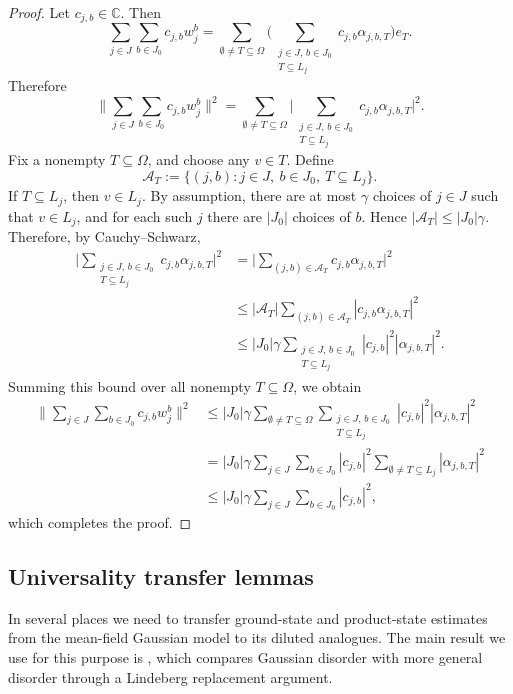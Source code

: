 \documentclass[12pt]{article}
\newcommand{\C}{\mathbb{C}}
\newcommand{\mcA}{\mathcal{A}}
\begin{document}
\begin{appendix}
\begin{proof}
Let \(c_{j,b}\in\C\).
Then
\[
\sum_{j\in J}\sum_{b\in J_0} c_{j,b}w_j^b
=
\sum_{\emptyset\neq T\subseteq\Omega}
\bigg(
\sum_{\substack{j\in J,\,b\in J_0\\ T\subseteq L_j}}
c_{j,b}\alpha_{j,b,T}
\bigg)e_T.
\]
Therefore
\[
\bigg \|
\sum_{j\in J}\sum_{b\in J_0} c_{j,b}w_j^b
\bigg \|^2
=
\sum_{\emptyset\neq T\subseteq\Omega}
\bigg |
\sum_{\substack{j\in J,\,b\in J_0\\ T\subseteq L_j}}
c_{j,b}\alpha_{j,b,T}
\bigg |^2.
\]
Fix a nonempty \(T\subseteq\Omega\), and choose any \(v\in T\). Define
\[
\mcA_T
:=
\{(j,b):j\in J,\ b\in J_0,\ T\subseteq L_j\}.
\]
If \(T\subseteq L_j\), then \(v\in L_j\). By assumption, there are at most
\(\gamma\) choices of \(j\in J\) such that \(v\in L_j\), and for each such \(j\) there
are \(|J_0|\) choices of \(b\). Hence \(|\mcA_T|\le |J_0|\gamma\). Therefore, by Cauchy--Schwarz,
\begin{align*}
\big |
\sum_{\substack{j\in J,\,b\in J_0\\ T\subseteq L_j}}
c_{j,b}\alpha_{j,b,T}
\big |^2
&=
\big |
\sum_{(j,b)\in\mcA_T}
c_{j,b}\alpha_{j,b,T}
\big |^2  \\
&\le
|\mcA_T|
\sum_{(j,b)\in\mcA_T}
|c_{j,b}\alpha_{j,b,T}|^2  \\
&\le
|J_0|\gamma
\sum_{\substack{j\in J,\,b\in J_0\\ T\subseteq L_j}}
|c_{j,b}|^2|\alpha_{j,b,T}|^2 .
\end{align*}
Summing this bound over all nonempty \(T\subseteq\Omega\), we obtain
\begin{align*}
\bigg\|
\sum_{j\in J}\sum_{b\in J_0} c_{j,b}w_j^b
\bigg\|^2
&\le
|J_0|\gamma
\sum_{\emptyset\neq T\subseteq\Omega}
\sum_{\substack{j\in J,\,b\in J_0\\ T\subseteq L_j}}
|c_{j,b}|^2|\alpha_{j,b,T}|^2  \\
&=
|J_0|\gamma
\sum_{j\in J}\sum_{b\in J_0} |c_{j,b}|^2
\sum_{\emptyset\neq T\subseteq L_j}
|\alpha_{j,b,T}|^2  \\
&\le
|J_0|\gamma
\sum_{j\in J}\sum_{b\in J_0} |c_{j,b}|^2,
\end{align*}
which completes the proof.
\end{proof}



\subsection{Universality transfer lemmas}
\label{app:universality-transfer}

In several places we need to transfer ground-state and product-state estimates from the mean-field Gaussian model to its diluted analogues. The main result we use for this purpose is \cite[Theorem~6]{anschuetz2025bounds}, which compares Gaussian disorder with more general disorder through a Lindeberg replacement argument.


\end{appendix}
\end{document}
